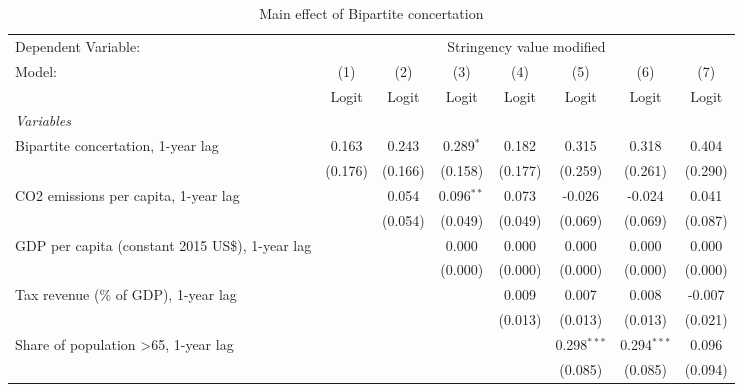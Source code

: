 
\begin{table}[htbp]
   \caption{Main effect of Bipartite concertation}
   \centering
   \begin{tabular}{lccccccc}
      \toprule
      Dependent Variable: & \multicolumn{7}{c}{Stringency value modified}\\
      Model:                                                & (1)     & (2)     & (3)          & (4)     & (5)           & (6)           & (7)\\  
                                                            &  Logit  & Logit   & Logit        & Logit   & Logit         & Logit         & Logit\\  
      \midrule
      \emph{Variables}\\
      Bipartite concertation, 1-year lag                    & 0.163   & 0.243   & 0.289$^{*}$  & 0.182   & 0.315         & 0.318         & 0.404\\   
                                                            & (0.176) & (0.166) & (0.158)      & (0.177) & (0.259)       & (0.261)       & (0.290)\\   
      CO2 emissions per capita, 1-year lag                  &         & 0.054   & 0.096$^{**}$ & 0.073   & -0.026        & -0.024        & 0.041\\   
                                                            &         & (0.054) & (0.049)      & (0.049) & (0.069)       & (0.069)       & (0.087)\\   
      GDP per capita (constant 2015 US\$), 1-year lag       &         &         & 0.000        & 0.000   & 0.000         & 0.000         & 0.000\\   
                                                            &         &         & (0.000)      & (0.000) & (0.000)       & (0.000)       & (0.000)\\   
      Tax revenue (\% of GDP), 1-year lag                   &         &         &              & 0.009   & 0.007         & 0.008         & -0.007\\   
                                                            &         &         &              & (0.013) & (0.013)       & (0.013)       & (0.021)\\   
      Share of population >65, 1-year lag                   &         &         &              &         & 0.298$^{***}$ & 0.294$^{***}$ & 0.096\\   
                                                            &         &         &              &         & (0.085)       & (0.085)       & (0.094)\\   

\end{tabular}
\end{table}
